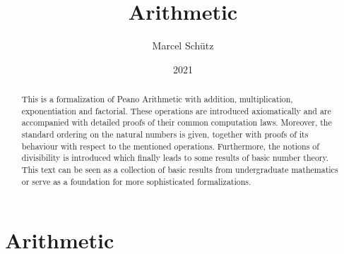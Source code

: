 \documentclass{article}
\title{Arithmetic}
\author{Marcel Schütz}
\date{2021}
\begin{document}
  \maketitle

  \begin{abstract}
    This is a formalization of Peano Arithmetic with addition, multiplication,
    exponentiation and factorial.
    These operations are introduced axiomatically and are accompanied with
    detailed proofs of their common computation laws.
    Moreover, the standard ordering on the natural numbers is given, together
    with proofs of its behaviour with respect to the mentioned operations.
    Furthermore, the notions of divisibility is introduced which finally leads
    to some results of basic number theory.
    This text can be seen as a collection of basic results from undergraduate
    mathematics or serve as a foundation for more sophisticated formalizations.
  \end{abstract}

  \tableofcontents

  \newpage
  \part{Arithmetic}

  
  \begin{comment}
    \begin{forthel}
      [readtex \path{arithmetic/sections/01_arithmetic/01_peano-axioms.ftl.tex}]
    \end{forthel}
  \end{comment}

  
  \begin{comment}
    \begin{forthel}
      [readtex \path{arithmetic/sections/01_arithmetic/02_addition.ftl.tex}]
    \end{forthel}
  \end{comment}

  
  \begin{comment}
    \begin{forthel}
      [readtex \path{arithmetic/sections/01_arithmetic/03_multiplication.ftl.tex}]
    \end{forthel}
  \end{comment}

  
  \begin{comment}
    \begin{forthel}
      [readtex \path{arithmetic/sections/01_arithmetic/04_exponentiation.ftl.tex}]
    \end{forthel}
  \end{comment}
\end{document}
